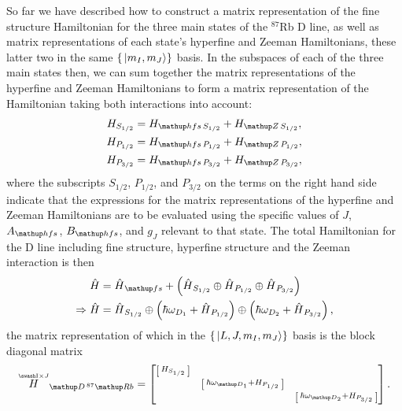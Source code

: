 So far we have described how to construct a matrix representation of the fine structure Hamiltonian for the three main states of the $^{87}$Rb D line, as well as matrix representations of each state's hyperfine and Zeeman Hamiltonians, these latter two in the same $\{\ket{m_I, m_J}\}$ basis. In the subspaces of each of the three main states then, we can sum together the matrix representations of the hyperfine and Zeeman Hamiltonians to form a matrix representation of the Hamiltonian taking both interactions into account:
\begin{align}
H_{S_{1/2}} &= H_{\up{hfs}\,S_{1/2}} + H_{\up{Z}\,S_{1/2}},\\
H_{P_{1/2}} &= H_{\up{hfs}\,P_{1/2}} + H_{\up{Z}\,P_{1/2}},\\
H_{P_{3/2}} &= H_{\up{hfs}\,P_{3/2}} + H_{\up{Z}\,P_{3/2}},
\end{align}
where the subscripts $S_{1/2}$, $P_{1/2}$, and $P_{3/2}$ on the terms on the right hand side indicate that the expressions for the matrix representations of the hyperfine and Zeeman Hamiltonians are to be evaluated using the specific values of $J$, $A_\up{hfs}$, $B_\up{hfs}$, and $g_J$ relevant to that state. The total Hamiltonian for the D line including fine structure, hyperfine structure and the Zeeman interaction is then
\begin{align}
\hat H &= \hat H_\up{fs} +
    \left(\hat H_{S_{1/2}} \oplus \hat H_{P_{1/2}} \oplus \hat H_{P_{3/2}} \right)\\
\Rightarrow \hat H &= 
\hat H_{S_{1/2}} \oplus
\left(\hbar\omega_{D_1} + \hat H_{P_{1/2}}\right) \oplus
\left(\hbar\omega_{D_2} + \hat H_{P_{3/2}}\right),
\end{align}
the matrix representation of which in the $\{\ket{L, J, m_I, m_J}\}$ basis is the block diagonal matrix
\begin{align}
\toverset{\mathcal{I}\times{J}}H_{\up{D}\,^{87}\up{Rb}}  = 
\left[\begin{matrix}
    \left[\begin{smallmatrix}
        H_{S_{1/2}}\\
    \end{smallmatrix} \right]\\
    & \left[\begin{smallmatrix}
        \hbar\omega_{\up{D}_1}+H_{P_{1/2}}\\
      \end{smallmatrix} \right]\\
    & &\left[\begin{smallmatrix}
        \hbar\omega_{\up{D}_2}+H_{P_{3/2}}\\
        \end{smallmatrix} \right]\\
\end{matrix} \right].
\end{align}
